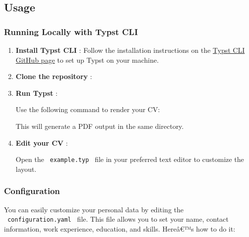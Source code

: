 \subsection{Usage}\label{usage}

\subsubsection{Running Locally with Typst
CLI}\label{running-locally-with-typst-cli}

\begin{enumerate}
\item
  \textbf{Install Typst CLI} : Follow the installation instructions on
  the \href{https://github.com/typst/typst\#installation}{Typst CLI
  GitHub page} to set up Typst on your machine.
\item
  \textbf{Clone the repository} :

\begin{Shaded}
\begin{Highlighting}[]
\end{Highlighting}
\end{Shaded}
\item
  \textbf{Run Typst} :

  Use the following command to render your CV:

\begin{Shaded}
\begin{Highlighting}[]
\end{Highlighting}
\end{Shaded}

  This will generate a PDF output in the same directory.
\item
  \textbf{Edit your CV} :

  Open the \texttt{\ example.typ\ } file in your preferred text editor
  to customize the layout.
\end{enumerate}

\subsubsection{Configuration}\label{configuration}

You can easily customize your personal data by editing the
\texttt{\ configuration.yaml\ } file. This file allows you to set your
name, contact information, work experience, education, and skills.
Hereâ€™s how to do it:


